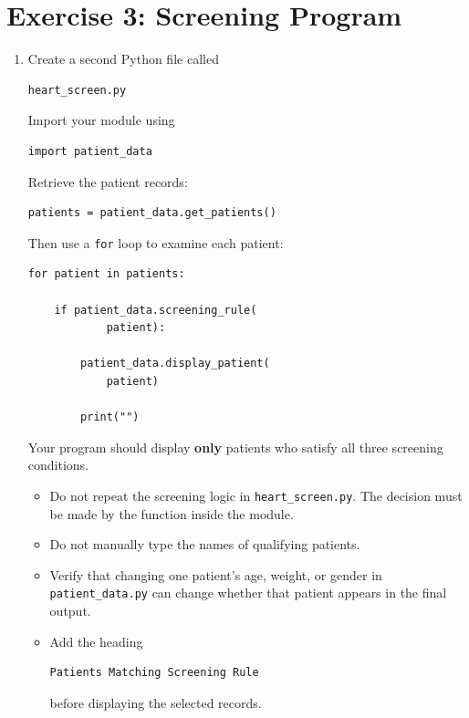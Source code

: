\documentclass{article}
\begin{document}
\section{Exercise 3: Screening Program}

\begin{enumerate}

\item Create a second Python file called

\begin{verbatim}
heart_screen.py
\end{verbatim}

Import your module using

\begin{verbatim}
import patient_data
\end{verbatim}

Retrieve the patient records:

\begin{verbatim}
patients = patient_data.get_patients()
\end{verbatim}

Then use a \texttt{for} loop to examine each patient:

\begin{verbatim}
for patient in patients:

    if patient_data.screening_rule(
            patient):

        patient_data.display_patient(
            patient)

        print("")
\end{verbatim}

Your program should display \textbf{only} patients who satisfy
all three screening conditions.

\begin{itemize}

\item Do not repeat the screening logic in
\texttt{heart\_screen.py}.  The decision must be made by the
function inside the module.

\item Do not manually type the names of qualifying patients.

\item Verify that changing one patient's age, weight, or gender in
\texttt{patient\_data.py} can change whether that patient appears
in the final output.

\item Add the heading

\begin{verbatim}
Patients Matching Screening Rule
\end{verbatim}

before displaying the selected records.

\end{itemize}

\end{enumerate}
\end{document}
